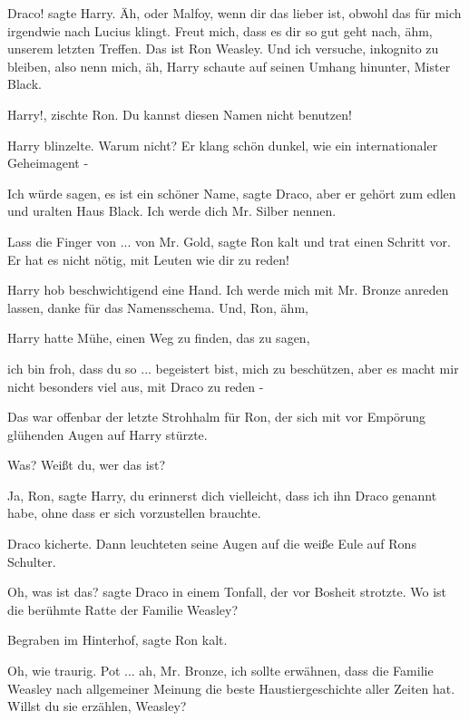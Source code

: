 \glqq{}Draco!\grqq{} sagte Harry. \glqq{}Äh, oder Malfoy, wenn dir das lieber
ist, obwohl das für mich irgendwie nach Lucius klingt. Freut mich, dass es dir
so gut geht nach, ähm, unserem letzten Treffen. Das ist Ron Weasley. Und ich
versuche, inkognito zu bleiben, also nenn mich, äh\grqq{}, Harry schaute auf
seinen Umhang hinunter, \glqq{}Mister Black.\grqq{}

\glqq{}Harry!\grqq{}, zischte Ron. \glqq{}Du kannst diesen Namen nicht
benutzen!\grqq{}

Harry blinzelte. \glqq{}Warum nicht?\grqq{} Er klang schön dunkel, wie ein
internationaler Geheimagent -

\glqq{}Ich würde sagen, es ist ein schöner Name\grqq{}, sagte Draco, \glqq{}aber
er gehört zum edlen und uralten Haus Black. Ich werde dich Mr. Silber
nennen.\grqq{}

\glqq{}Lass die Finger von ... von Mr. Gold\grqq{}, sagte Ron kalt und trat
einen Schritt vor. \glqq{}Er hat es nicht nötig, mit Leuten wie dir zu
reden!\grqq{}

Harry hob beschwichtigend eine Hand. \glqq{}Ich werde mich mit Mr. Bronze
anreden lassen, danke für das Namensschema. Und, Ron, ähm\grqq{},

Harry hatte Mühe, einen Weg zu finden, das zu sagen,

\glqq{}ich bin froh, dass du so ... begeistert bist, mich zu beschützen, aber es
macht mir nicht besonders viel aus, mit Draco zu reden -\grqq{}

Das war offenbar der letzte Strohhalm für Ron, der sich mit vor Empörung
glühenden Augen auf Harry stürzte.

\glqq{}Was? Weißt du, wer das ist?\grqq{}

\glqq{}Ja, Ron\grqq{}, sagte Harry, \glqq{}du erinnerst dich vielleicht, dass
ich ihn Draco genannt habe, ohne dass er sich vorzustellen brauchte.\grqq{}

Draco kicherte. Dann leuchteten seine Augen auf die weiße Eule auf Rons
Schulter.

\glqq{}Oh, was ist das?\grqq{} sagte Draco in einem Tonfall, der vor Bosheit
strotzte. \glqq{}Wo ist die berühmte Ratte der Familie Weasley?\grqq{}

\glqq{}Begraben im Hinterhof\grqq{}, sagte Ron kalt.

\glqq{}Oh, wie traurig. Pot ... ah, Mr. Bronze, ich sollte erwähnen, dass die
Familie Weasley nach allgemeiner Meinung die beste Haustiergeschichte aller
Zeiten hat. Willst du sie erzählen, Weasley?\grqq{}

